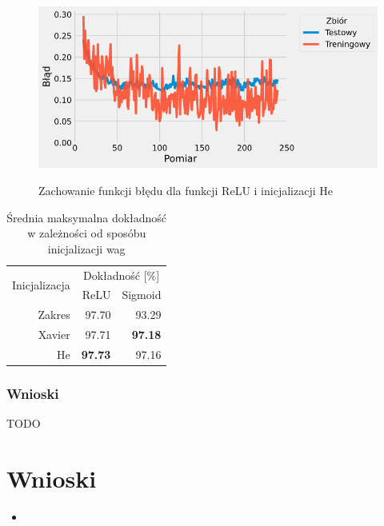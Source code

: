\documentclass{article}
\begin{document}
\begin{figure}[H]
	\centering
	\caption{Zachowanie funkcji błędu dla funkcji ReLU i inicjalizacji He}
	\includegraphics[width=\textwidth]{sig_init_he.png}
	\label{fig:res210}
\end{figure}

\begin{table}[H]
	\caption{Średnia maksymalna dokładność w zależności od sposóbu inicjalizacji wag}
	\label{tabela-res-21}
	\centering
	\begin{tabular}{rrr}
		\toprule
		\multirow{2}{*}{Inicjalizacja} & \multicolumn{2}{c}{Dokładność [\%]} \\
		       & ReLU           & Sigmoid        \\
		\midrule
		Zakres & 97.70          & 93.29          \\
		Xavier & 97.71          & \textbf{97.18} \\
		He     & \textbf{97.73} & 97.16          \\
		\bottomrule
	\end{tabular}
\end{table}

\subsubsection*{Wnioski}

TODO


\newpage
\section{Wnioski}

\begin{itemize}
	\item %
\end{itemize}
\end{document}
